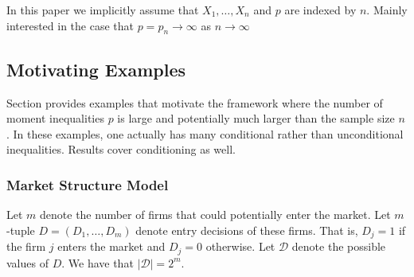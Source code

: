 In this paper we implicitly assume that $X_1, \dots, X_n$ and $p$ are indexed by $n$. Mainly interested in the case that $p = p_n \rightarrow \infty$ as $n \rightarrow \infty$

\subsection{Motivating Examples}

Section provides examples that motivate the framework where the number of moment inequalities $p$ is large and potentially much larger than the sample size $n$. In these examples, one actually has many conditional rather than unconditional inequalities. Results cover conditioning as well. 

\subsubsection{Market Structure Model}

Let $m$ denote the number of firms that could potentially enter the market. Let $m$-tuple $D = (D_1, \dots, D_m)$ denote entry decisions of these firms. That is, $D_j = 1$ if the firm $j$ enters the market and $D_j = 0$ otherwise. Let $\mathscr{D}$ denote the possible values of $D$. We have that $|\mathscr{D}| = 2^m$. 

